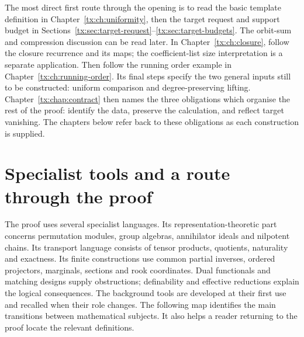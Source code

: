 The most direct first route through the opening is to read the basic
template definition in Chapter~\ref{tx:ch:uniformity}, then the target
request and support budget in
Sections~\ref{tx:sec:target-request}--\ref{tx:sec:target-budgets}.
The orbit-sum and compression discussion can be read later. In
Chapter~\ref{tx:ch:closure}, follow the closure recurrence and its maps;
the coefficient-list size interpretation is a separate application.
Then follow the running order example in
Chapter~\ref{tx:ch:running-order}. Its final steps specify the two
general inputs still to be constructed: uniform comparison and
degree-preserving lifting.
Chapter~\ref{tx:chap:contract} then names the three obligations which
organise the rest of the proof: identify the data, preserve the
calculation, and reflect target vanishing. The chapters below refer
back to these obligations as each construction is supplied.

\section*{Specialist tools and a route through the proof}
The proof uses several specialist languages. Its representation-theoretic
part concerns permutation modules, group algebras, annihilator ideals
and nilpotent chains. Its transport language consists of tensor products,
quotients, naturality and exactness. Its finite constructions use common
partial inverses, ordered projectors, marginals, sections and rook
coordinates. Dual functionals and matching designs supply obstructions;
definability and effective reductions explain the logical consequences.
The background tools are developed at their first use and recalled
when their role changes. The following map identifies the main
transitions between mathematical subjects. It also helps a reader
returning to the proof locate the relevant definitions.

